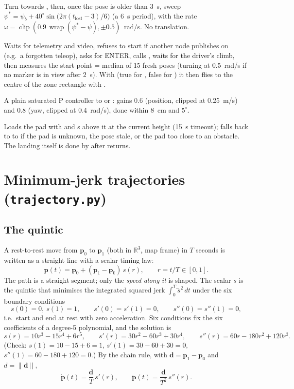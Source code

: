 Turn towards , then, once the pose is older than 3~s, sweep
$\psi^\ast = \psi_b + 40^\circ \sin\big(2\pi (t_{\text{lost}}-3)/6\big)$ (a 6~s period), with the rate
$\omega = \operatorname{clip}(0.9\,\operatorname{wrap}(\psi^\ast-\psi), \pm 0.5)$~rad/s. No translation.

Waits for telemetry and video, refuses to start if another node publishes on 
(e.g.\ a forgotten teleop), asks for ENTER, calls , waits for the driver's climb, then measures the
start point  = median of 15 fresh poses (turning at 0.5~rad/s if no marker is in view after 2~s). With
 (true for , false for ) it then flies to the centre of
the zone rectangle with .

A plain saturated P controller to  or : gains 0.6 (position, clipped at 0.25~m/s) and 0.8
(yaw, clipped at 0.4~rad/s), done within 8~cm and $5^\circ$.

Loads the pad with  and s above it at the current height (15~s timeout);
falls back to  to  if the pad is unknown, the pose stale, or the pad too close to an
obstacle. The landing itself is done by  after  returns.

\section{Minimum-jerk trajectories (\texorpdfstring{\texttt{trajectory.py}}{trajectory.py})}

\subsection{The quintic}

A rest-to-rest move from $\mathbf p_0$ to $\mathbf p_1$ (both in $\mathbb R^3$, map frame) in $T$ seconds is
written as a straight line with a scalar timing law:
$$
\mathbf p(t) = \mathbf p_0 + (\mathbf p_1 - \mathbf p_0)\, s(r), \qquad r = t/T \in [0,1].
$$
The path is a straight segment; only the \emph{speed along it} is shaped. The scalar $s$ is the quintic that
minimises the integrated squared jerk $\int_0^T \dddot{s}^2\,dt$ under the six boundary conditions
$$
s(0)=0,\ s(1)=1,\qquad s'(0)=s'(1)=0,\qquad s''(0)=s''(1)=0,
$$
i.e.\ start and end at rest with zero acceleration. Six conditions fix the six coefficients of a degree-5
polynomial, and the solution is
$$
s(r) = 10r^3 - 15r^4 + 6r^5,\qquad
s'(r) = 30r^2 - 60r^3 + 30r^4,\qquad
s''(r) = 60r - 180r^2 + 120r^3 .
$$
(Check: $s(1)=10-15+6=1$, $s'(1)=30-60+30=0$, $s''(1)=60-180+120=0$.) By the chain rule, with
$\mathbf d = \mathbf p_1-\mathbf p_0$ and $d = \lVert \mathbf d\rVert$,
$$
\dot{\mathbf p}(t) = \frac{\mathbf d}{T}\, s'(r), \qquad \ddot{\mathbf p}(t) = \frac{\mathbf d}{T^2}\, s''(r).
$$

